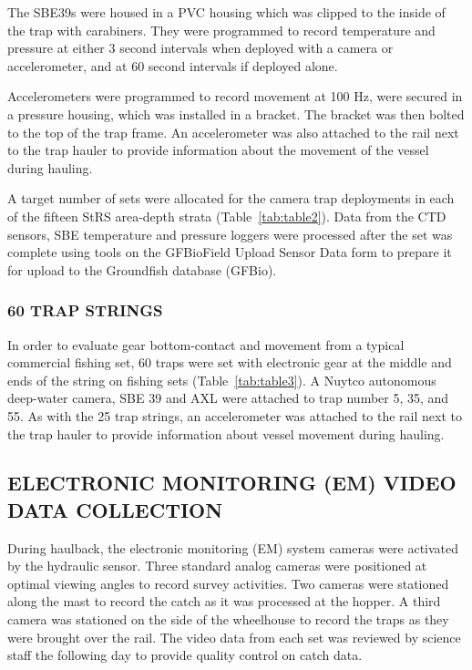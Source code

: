 \documentclass[12pt]{article}\usepackage[]{graphicx}\usepackage[]{color}
\begin{document}
The SBE39s were housed in a PVC housing which was clipped to the inside of the trap with carabiners. They were programmed to record temperature and pressure at either 3 second intervals when deployed with a camera or accelerometer, and at 60 second intervals if deployed alone.

Accelerometers were programmed to record movement at 100 Hz, were secured in a pressure housing, which was installed in a bracket. The bracket was then bolted to the top of the trap frame. An accelerometer was also attached to the rail next to the trap hauler to provide information about the movement of the vessel during hauling.

A target number of sets were allocated for the camera trap deployments in each of the fifteen StRS area-depth strata (Table~\ref{tab:table2}). Data from the CTD sensors, SBE temperature and pressure loggers were processed after the set was complete using tools on the GFBioField Upload Sensor Data form to prepare it for upload to the Groundfish database (GFBio).

\hypertarget{trap-strings-2}{%
\subsubsection{60 TRAP STRINGS}\label{trap-strings-2}}

In order to evaluate gear bottom-contact and movement from a typical commercial fishing set, 60 traps were set with electronic gear at the middle and ends of the string on fishing sets (Table~\ref{tab:table3}). A Nuytco autonomous deep-water camera, SBE 39 and AXL were attached to trap number 5, 35, and 55. As with the 25 trap strings, an accelerometer was attached to the rail next to the trap hauler to provide information about vessel movement during hauling.

\hypertarget{electronic-monitoring-em-video-data-collection}{%
\subsection{ELECTRONIC MONITORING (EM) VIDEO DATA COLLECTION}\label{electronic-monitoring-em-video-data-collection}}

During haulback, the electronic monitoring (EM) system cameras were activated by the hydraulic sensor. Three standard analog cameras were positioned at optimal viewing angles to record survey activities. Two cameras were stationed along the mast to record the catch as it was processed at the hopper. A third camera was stationed on the side of the wheelhouse to record the traps as they were brought over the rail. The video data from each set was reviewed by science staff the following day to provide quality control on catch data.
\end{document}
